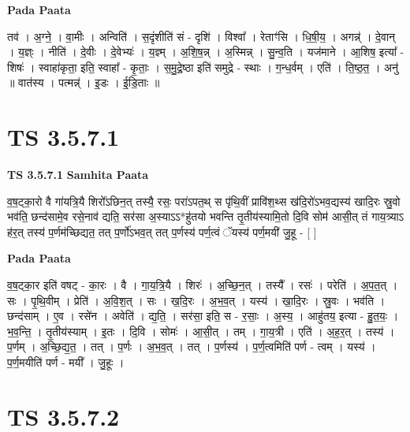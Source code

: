 \documentclass[17pt]{extarticle}
\begin{document}
\textbf{Pada Paata} \newline

तव॑ । अ॒ग्ने॒ । वा॒मीः । अन्विति॑ । स॒दृंशीति॑ सं - दृशि॑ । विश्वा᳚ । रेताꣳ॑सि । धि॒षी॒य॒ । अगन्न्॑ । दे॒वान् । य॒ज्ञ्ः । नीति॑ । दे॒वीः । दे॒वेभ्यः॑ । य॒ज्ञ्म् । अ॒शि॒ष॒न्न् । अ॒स्मिन्न् । सु॒न्व॒ति । यज॑माने । आ॒शिष॒ इत्या᳚ - शिषः॑ । स्वाहा॑कृता॒ इति॒ स्वाहा᳚ - कृ॒ताः॒ । स॒मु॒द्रे॒ष्ठा इति॑ समुद्रे - स्थाः । ग॒न्ध॒र्वम् । एति॑ । ति॒ष्ठ॒त॒ । अनु॑ ॥ वात॑स्य । पत्मन्न्॑ । इ॒डः । ई॒डि॒ताः ॥  \newline





\section{ TS 3.5.7.1 }

\textbf{TS 3.5.7.1 } \newline
\textbf{Samhita Paata} \newline

व॒ष॒ट्का॒रो वै गा॑यत्रि॒यै शिरो᳚ऽछिन॒त् तस्यै॒ रसः॒ परा॑ऽपत॒थ् स पृ॑थि॒वीं प्रावि॑श॒थ्स ख॑दि॒रो॑ऽभव॒द्यस्य॑ खादि॒रः स्रु॒वो भव॑ति॒ छन्द॑सामे॒व रसे॒नाव॑ द्यति॒ सर॑सा अ॒स्याऽऽ*हु॑तयो भवन्ति तृ॒तीय॑स्यामि॒तो दि॒वि सोम॑ आसी॒त् तं गाय॒त्र्याऽ ह॑र॒त् तस्य॑ प॒र्णम॑च्छिद्यत॒ तत् प॒र्णो॑ऽभव॒त् तत् प॒र्णस्य॑ पर्ण॒त्वं ॅयस्य॑ पर्ण॒मयी॑ जु॒हू - [  ] \newline

\textbf{Pada Paata} \newline

व॒ष॒ट्का॒र इति॑ वषट् - का॒रः । वै । गा॒य॒त्रि॒यै । शिरः॑ । अ॒च्छि॒न॒त् । तस्यै᳚ । रसः॑ । परेति॑ । अ॒प॒त॒त् । सः । पृ॒थि॒वीम् । प्रेति॑ । अ॒वि॒श॒त् । सः । ख॒दि॒रः । अ॒भ॒व॒त् । यस्य॑ । खा॒दि॒रः । स्रु॒वः । भव॑ति । छन्द॑साम् । ए॒व । रसे॑न । अवेति॑ । द्य॒ति॒ । सर॑सा॒ इति॒ स - र॒साः॒ । अ॒स्य॒ । आहु॑तय॒ इत्या - हु॒त॒यः॒ । भ॒व॒न्ति॒ । तृ॒तीय॑स्याम् । इ॒तः । दि॒वि । सोमः॑ । आ॒सी॒त् । तम् । गा॒य॒त्री । एति॑ । अ॒ह॒र॒त् । तस्य॑ । प॒र्णम् । अ॒च्छि॒द्य॒त॒ । तत् । प॒र्णः । अ॒भ॒व॒त् । तत् । प॒र्णस्य॑ । प॒र्ण॒त्वमिति॑ पर्ण - त्वम् । यस्य॑ । प॒र्ण॒मयीति॑ पर्ण - मयी᳚ । जु॒हूः ।  \newline





\section{ TS 3.5.7.2 }
\end{document}
